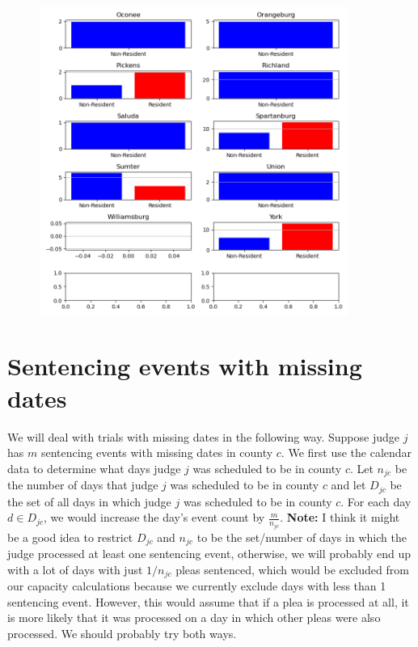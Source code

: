 \documentclass[11pt]{article}
\begin{document}
    \begin{figure}[H]
      \centering
      \includegraphics[width=0.9\textwidth]{../../../output/figures/Exploration/county_trial_hist_3.png}
    \end{figure}

\section{Sentencing events with missing dates}
  We will deal with trials with missing dates in the following way. Suppose judge $j$ has $m$ sentencing events with missing dates in county $c$. We first use the calendar data to determine what days judge $j$ was scheduled to be in county $c$. Let $n_{jc}$ be the number of days that judge $j$ was scheduled to be in county $c$ and let $D_{jc}$ be the set of all days in which judge $j$ was scheduled to be in county $c$. For each day $d \in D_{jc}$, we would increase the day's event count by $\frac{m}{n_{jc}}$. \textbf{Note:} I think it might be a good idea to restrict $D_{jc}$ and $n_{jc}$ to be the set/number of days in which the judge processed at least one sentencing event, otherwise, we will probably end up with a lot of days with just $1/n_{jc}$ pleas sentenced, which would be excluded from our capacity calculations because we currently exclude days with less than 1 sentencing event. However, this would assume that if a plea is processed at all, it is more likely that it was processed on a day in which other pleas were also processed. We should probably try both ways.
\end{document}
